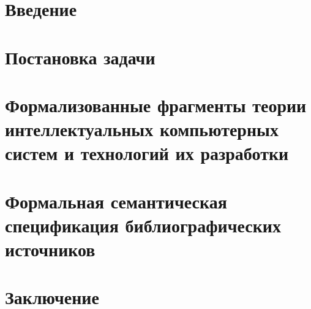 \section*{Введение}


\newpage
\section{Постановка задачи}


\newpage
\section{Формализованные фрагменты теории интеллектуальных компьютерных систем и технологий их разработки}


\newpage
\section{Формальная семантическая спецификация библиографических источников}


\newpage
\section*{Заключение}

